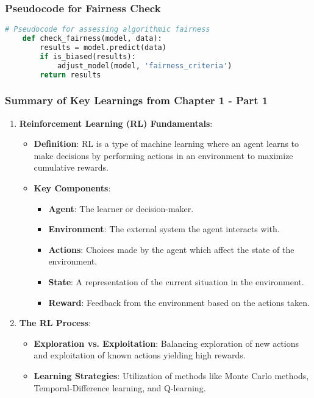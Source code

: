 \documentclass[aspectratio=169]{beamer}
\begin{document}
\begin{frame}[fragile]
    \frametitle{Pseudocode for Fairness Check}
    \begin{lstlisting}[language=Python]
    # Pseudocode for assessing algorithmic fairness
    def check_fairness(model, data):
        results = model.predict(data)
        if is_biased(results):
            adjust_model(model, 'fairness_criteria')
        return results
    \end{lstlisting}
\end{frame}

\begin{frame}[fragile]
    \frametitle{Summary of Key Learnings from Chapter 1 - Part 1}
    \begin{enumerate}
        \item \textbf{Reinforcement Learning (RL) Fundamentals}:
        \begin{itemize}
            \item \textbf{Definition}: RL is a type of machine learning where an agent learns to make decisions by performing actions in an environment to maximize cumulative rewards.
            \item \textbf{Key Components}:
            \begin{itemize}
                \item \textbf{Agent}: The learner or decision-maker.
                \item \textbf{Environment}: The external system the agent interacts with.
                \item \textbf{Actions}: Choices made by the agent which affect the state of the environment.
                \item \textbf{State}: A representation of the current situation in the environment.
                \item \textbf{Reward}: Feedback from the environment based on the actions taken.
            \end{itemize}
        \end{itemize}
        
        \item \textbf{The RL Process}:
        \begin{itemize}
            \item \textbf{Exploration vs. Exploitation}: Balancing exploration of new actions and exploitation of known actions yielding high rewards.
            \item \textbf{Learning Strategies}: Utilization of methods like Monte Carlo methods, Temporal-Difference learning, and Q-learning.
        \end{itemize}
    \end{enumerate}
\end{frame}
\end{document}
